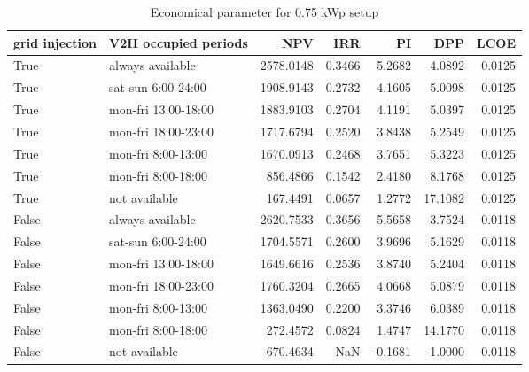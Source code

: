 \begin{table}
\centering
\caption{Economical parameter for 0.75 kWp setup}
\label{tab:results-0.75}
\begin{tabular}{llrrrrr}
\toprule
 grid injection & V2H occupied periods &       NPV &    IRR &      PI &     DPP &   LCOE \\
\midrule
           True &     always available & 2578.0148 & 0.3466 &  5.2682 &  4.0892 & 0.0125 \\
           True &   sat-sun 6:00-24:00 & 1908.9143 & 0.2732 &  4.1605 &  5.0098 & 0.0125 \\
           True &  mon-fri 13:00-18:00 & 1883.9103 & 0.2704 &  4.1191 &  5.0397 & 0.0125 \\
           True &  mon-fri 18:00-23:00 & 1717.6794 & 0.2520 &  3.8438 &  5.2549 & 0.0125 \\
           True &   mon-fri 8:00-13:00 & 1670.0913 & 0.2468 &  3.7651 &  5.3223 & 0.0125 \\
           True &   mon-fri 8:00-18:00 &  856.4866 & 0.1542 &  2.4180 &  8.1768 & 0.0125 \\
           True &        not available &  167.4491 & 0.0657 &  1.2772 & 17.1082 & 0.0125 \\
          False &     always available & 2620.7533 & 0.3656 &  5.5658 &  3.7524 & 0.0118 \\
          False &   sat-sun 6:00-24:00 & 1704.5571 & 0.2600 &  3.9696 &  5.1629 & 0.0118 \\
          False &  mon-fri 13:00-18:00 & 1649.6616 & 0.2536 &  3.8740 &  5.2404 & 0.0118 \\
          False &  mon-fri 18:00-23:00 & 1760.3204 & 0.2665 &  4.0668 &  5.0879 & 0.0118 \\
          False &   mon-fri 8:00-13:00 & 1363.0490 & 0.2200 &  3.3746 &  6.0389 & 0.0118 \\
          False &   mon-fri 8:00-18:00 &  272.4572 & 0.0824 &  1.4747 & 14.1770 & 0.0118 \\
          False &        not available & -670.4634 &    NaN & -0.1681 & -1.0000 & 0.0118 \\
\bottomrule
\end{tabular}
\end{table}
